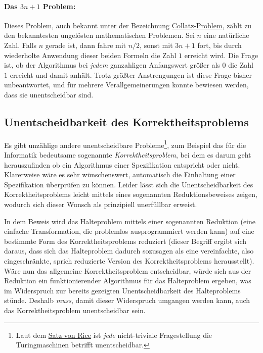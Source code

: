 \paragraph{Das $3n+1$ Problem:} Dieses Problem, auch bekannt unter der Bezeichnung \href{http://de.wikipedia.org/wiki/Collatz-Problem}{Collatz-Problem}, zählt zu den bekanntesten ungelösten mathematischen Problemen. Sei $n$ eine natürliche Zahl. Falls $n$ gerade ist, dann fahre mit $n/2$, sonst mit $3n+1$ fort, bis durch wiederholte Anwendung dieser beiden Formeln die Zahl $1$ erreicht wird. Die Frage ist, ob der Algorithmus bei \emph{jedem} ganzahligen Anfangswert größer als $0$ die Zahl $1$ erreicht und damit anhält. Trotz größter Anstrengungen ist diese Frage bisher unbeantwortet, und für mehrere Verallgemeinerungen konnte bewiesen werden, dass sie unentscheidbar sind.

\subsection{Unentscheidbarkeit des Korrektheitsproblems}
Es gibt unzählige andere unentscheidbare Probleme\footnote{Laut dem \href{http://de.wikipedia.org/wiki/Satz_von_Rice}{Satz von Rice} ist \emph{jede} nicht-triviale Fragestellung die Turingmaschinen betrifft unentscheidbar.}, zum Beispiel das für die Informatik bedeutsame sogenannte \emph{Korrektheitsproblem}, bei dem es darum geht herauszufinden ob ein Algorithmus einer Spezifikation entspricht oder nicht. Klarerweise wäre es sehr wünschenswert, automatisch die Einhaltung einer Spezifikation überprüfen zu können. Leider lässt sich die Unentscheidbarkeit des Korrektheitsproblems leicht mittels eines sogenannten Reduktionsbeweises zeigen, wodurch sich dieser Wunsch als prinzipiell unerfüllbar erweist.

In dem Beweis wird das Halteproblem mittels einer sogenannten Reduktion (eine einfache Transformation, die problemlos ausprogrammiert werden kann) auf eine bestimmte Form des Korrektheitsproblems reduziert (dieser Begriff ergibt sich daraus, dass sich das Halteproblem dadurch sozusagen als eine vereinfachte, also eingeschränkte, sprich reduzierte Version des Korrektheitsproblems herausstellt). Wäre nun das allgemeine Korrektheitspro\-blem entscheid\-bar, würde sich aus der Reduktion ein funktionierender Algorithmus für das Halteproblem ergeben, was im Widerspruch zur bereits gezeigten Unentscheidbarkeit des Halteproblems stünde. Deshalb \emph{muss}, damit dieser Widerspruch umgangen werden kann, auch das Korrekt\-heitsproblem unentscheidbar sein.

